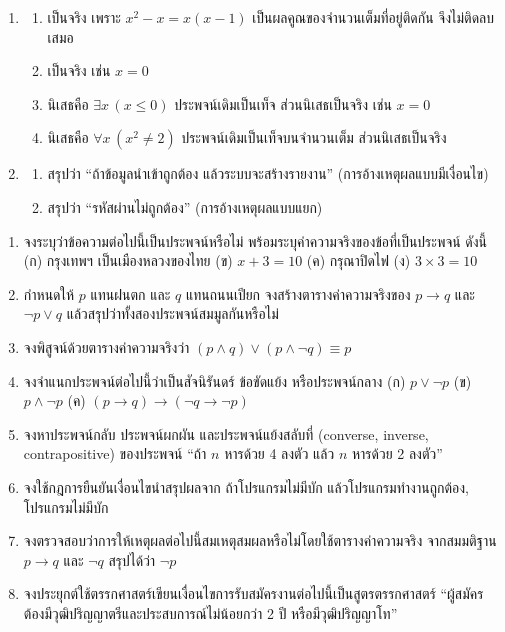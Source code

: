 \begin{enumerate}[label={},leftmargin=1.5em]
    \item
    \begin{enumerate}[label=\textbf{\thechapter.\arabic{enumi}.\arabic*}]
        \item เป็นจริง เพราะ $x^2 - x = x(x-1)$ เป็นผลคูณของจำนวนเต็มที่อยู่ติดกัน จึงไม่ติดลบเสมอ
        \item เป็นจริง เช่น $x = 0$
        \item นิเสธคือ $\exists x\, (x \leq 0)$ ประพจน์เดิมเป็นเท็จ ส่วนนิเสธเป็นจริง เช่น $x = 0$
        \item นิเสธคือ $\forall x\, (x^2 \neq 2)$ ประพจน์เดิมเป็นเท็จบนจำนวนเต็ม ส่วนนิเสธเป็นจริง
    \end{enumerate}

    \item
    \begin{enumerate}[label=\textbf{\thechapter.\arabic{enumi}.\arabic*}]
        \item สรุปว่า ``ถ้าข้อมูลนำเข้าถูกต้อง แล้วระบบจะสร้างรายงาน'' (การอ้างเหตุผลแบบมีเงื่อนไข)
        \item สรุปว่า ``รหัสผ่านไม่ถูกต้อง'' (การอ้างเหตุผลแบบแยก)
    \end{enumerate}
\end{enumerate}

\QAChapter
\begin{enumerate}
    \item จงระบุว่าข้อความต่อไปนี้เป็นประพจน์หรือไม่ พร้อมระบุค่าความจริงของข้อที่เป็นประพจน์ ดังนี้ (ก) กรุงเทพฯ เป็นเมืองหลวงของไทย (ข) $x + 3 = 10$ (ค) กรุณาปิดไฟ (ง) $3 \times 3 = 10$
    \item กำหนดให้ $p$ แทนฝนตก และ $q$ แทนถนนเปียก จงสร้างตารางค่าความจริงของ $p \rightarrow q$ และ $\neg p \lor q$ แล้วสรุปว่าทั้งสองประพจน์สมมูลกันหรือไม่
    \item จงพิสูจน์ด้วยตารางค่าความจริงว่า $(p \land q) \lor (p \land \neg q) \equiv p$
    \item จงจำแนกประพจน์ต่อไปนี้ว่าเป็นสัจนิรันดร์ ข้อขัดแย้ง หรือประพจน์กลาง (ก) $p \lor \neg p$ (ข) $p \land \neg p$ (ค) $(p \rightarrow q) \rightarrow (\neg q \rightarrow \neg p)$
    \item จงหาประพจน์กลับ ประพจน์ผกผัน และประพจน์แย้งสลับที่ (converse, inverse, contrapositive) ของประพจน์ ``ถ้า $n$ หารด้วย 4 ลงตัว แล้ว $n$ หารด้วย 2 ลงตัว''
    \item จงใช้กฎการยืนยันเงื่อนไขนำสรุปผลจาก ถ้าโปรแกรมไม่มีบัก แล้วโปรแกรมทำงานถูกต้อง, โปรแกรมไม่มีบัก
    \item จงตรวจสอบว่าการให้เหตุผลต่อไปนี้สมเหตุสมผลหรือไม่โดยใช้ตารางค่าความจริง จากสมมติฐาน $p \rightarrow q$ และ $\neg q$ สรุปได้ว่า $\neg p$
    \item จงประยุกต์ใช้ตรรกศาสตร์เขียนเงื่อนไขการรับสมัครงานต่อไปนี้เป็นสูตรตรรกศาสตร์ ``ผู้สมัครต้องมีวุฒิปริญญาตรีและประสบการณ์ไม่น้อยกว่า 2 ปี หรือมีวุฒิปริญญาโท''
\end{enumerate}

